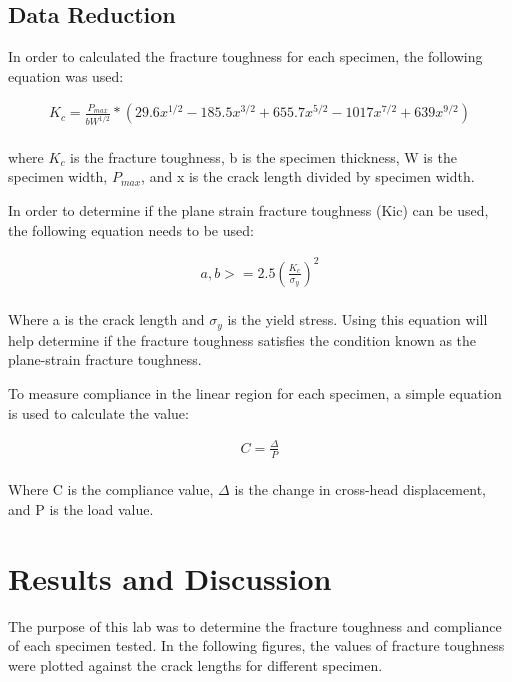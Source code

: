 \documentclass[12pt]{report}
\begin{document}
\subsection{Data Reduction}
In order to calculated the fracture toughness for each specimen, the following equation was used:

\begin{equation}
\begin{split}
  K_c = \frac{P_{max}}{bW^{1/2}} * (29.6x^{1/2} - 185.5x^{3/2} + 655.7x^{5/2} - 1017x^{7/2} + 639x^{9/2})
  \label{equation:equation1}
\end{split}
\end{equation}
\\
where \(K_c\) is the fracture toughness, b is the specimen thickness, W is the specimen width, \(P_{max}\), and x is the crack length divided by specimen width.


In order to determine if the plane strain fracture toughness (Kic) can be used, the following equation needs to be used:

\begin{equation}
\begin{split}
  a,b >= 2.5(\frac{K_c}{\sigma_{y}})^2
  \label{equation:equation2}
\end{split}
\end{equation}
\\
Where a is the crack length and \(\sigma_y\) is the yield stress. Using this equation will help determine if the fracture toughness satisfies the condition known as the plane-strain fracture toughness.


To measure compliance in the linear region for each specimen, a simple equation is used to calculate the value:

\begin{equation}
\begin{split}
  C = \frac{\Delta}{P}
  \label{equation:equation3}
\end{split}
\end{equation}
\\

Where C is the compliance value, \(\Delta\) is the change in cross-head displacement, and P is the load value. 

\section{Results and Discussion}
\doublespacing
The purpose of this lab was to determine the fracture toughness and compliance of each specimen tested. In the following figures, the values of fracture toughness were plotted against the crack lengths for different specimen. 
\end{document}
